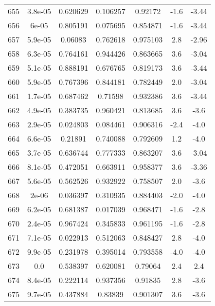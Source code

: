 \begin{table}
\begin{tabular}{c|c|c|c|c|c|c}
655 & 3.8e-05 & 0.620629 & 0.106257 & 0.92172 & -1.6 & -3.44\\
656 & 6e-05 & 0.805191 & 0.075695 & 0.854871 & -1.6 & -3.44\\
657 & 5.9e-05 & 0.06083 & 0.762618 & 0.975103 & 2.8 & -2.96\\
658 & 6.3e-05 & 0.764161 & 0.944426 & 0.863665 & 3.6 & -3.04\\
659 & 5.1e-05 & 0.888191 & 0.676765 & 0.819173 & 3.6 & -3.44\\
660 & 5.9e-05 & 0.767396 & 0.844181 & 0.782449 & 2.0 & -3.04\\
661 & 1.7e-05 & 0.687462 & 0.71598 & 0.932386 & 3.6 & -3.44\\
662 & 4.9e-05 & 0.383735 & 0.960421 & 0.813685 & 3.6 & -3.6\\
663 & 2.9e-05 & 0.024803 & 0.084461 & 0.906316 & -2.4 & -4.0\\
664 & 6.6e-05 & 0.21891 & 0.740088 & 0.792609 & 1.2 & -4.0\\
665 & 3.7e-05 & 0.636744 & 0.777333 & 0.863207 & 3.6 & -3.04\\
666 & 8.1e-05 & 0.472051 & 0.663911 & 0.958377 & 3.6 & -3.36\\
667 & 5.6e-05 & 0.562526 & 0.932922 & 0.758507 & 2.0 & -3.6\\
668 & 2e-06 & 0.036397 & 0.310935 & 0.884403 & -2.0 & -4.0\\
669 & 6.2e-05 & 0.681387 & 0.017039 & 0.968471 & -1.6 & -2.8\\
670 & 2.4e-05 & 0.967424 & 0.345833 & 0.961195 & -1.6 & -2.8\\
671 & 7.1e-05 & 0.022913 & 0.512063 & 0.848427 & 2.8 & -4.0\\
672 & 9.9e-05 & 0.231978 & 0.395014 & 0.793558 & -4.0 & -4.0\\
673 & 0.0 & 0.538397 & 0.620081 & 0.79064 & 2.4 & 2.4\\
674 & 8.4e-05 & 0.222114 & 0.937356 & 0.91835 & 2.8 & -3.6\\
675 & 9.7e-05 & 0.437884 & 0.83839 & 0.901307 & 3.6 & -3.6\\
\end{tabular}
\end{table}
\newpage
